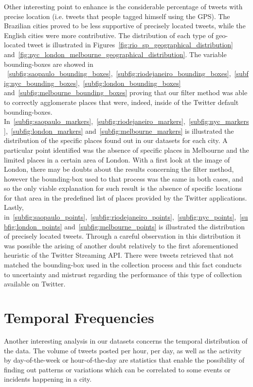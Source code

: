 Other interesting point to enhance is the considerable percentage of tweets with precise location (i.e. tweets that people tagged himself using the GPS). The Brazilian cities proved to be less supportive of precisely located tweets, while the English cities were more contributive. The distribution of each type of geo-located tweet is illustrated in Figures~\ref{fig:rio_sp_geographical_distribution} and~\ref{fig:nyc_london_melbourne_geographical_distribution}. The variable bounding-boxes are showed in ~\ref{subfig:saopaulo_bounding_boxes},~\ref{subfig:riodejaneiro_bounding_boxes},~\ref{subfig:nyc_bounding_boxes},~\ref{subfig:london_bounding_boxes} and~\ref{subfig:melbourne_bounding_boxes} proving that our filter method was able to correctly agglomerate places that were, indeed, inside of the Twitter default bounding-boxes. In~\ref{subfig:saopaulo_markers},~\ref{subfig:riodejaneiro_markers},~\ref{subfig:nyc_markers},~\ref{subfig:london_markers} and~\ref{subfig:melbourne_markers} is illustrated the distribution of the specific places found out in our datasets for each city. A particular point identified was the absence of specific places in Melbourne and the limited places in a certain area of London. With a first look at the image of London, there may be doubts about the results concerning the filter method, however the bounding-box used to that process was the same in both cases, and so the only viable explanation for such result is the absence of specific locations for that area in the predefined list of places provided by the Twitter applications. Lastly, in~\ref{subfig:saopaulo_points},~\ref{subfig:riodejaneiro_points},~\ref{subfig:nyc_points},~\ref{subfig:london_points} and~\ref{subfig:melbourne_points} is illustrated the distribution of precisely located tweets. Through a careful observation in this distribution it was possible the arising of another doubt relatively to the first aforementioned heuristic of the Twitter Streaming API. There were tweets retrieved that not matched the bounding-box used in the collection process and this fact conducts to uncertainty and mistrust regarding the performance of this type of collection available on Twitter. 

\section{Temporal Frequencies}

Another interesting analysis in our datasets concerns the temporal distribution of the data. The volume of tweets posted per hour, per day, as well as the activity by day-of-the-week or hour-of-the-day are statistics that enable the possibility of finding out patterns or variations which can be correlated to some events or incidents happening in a city.

